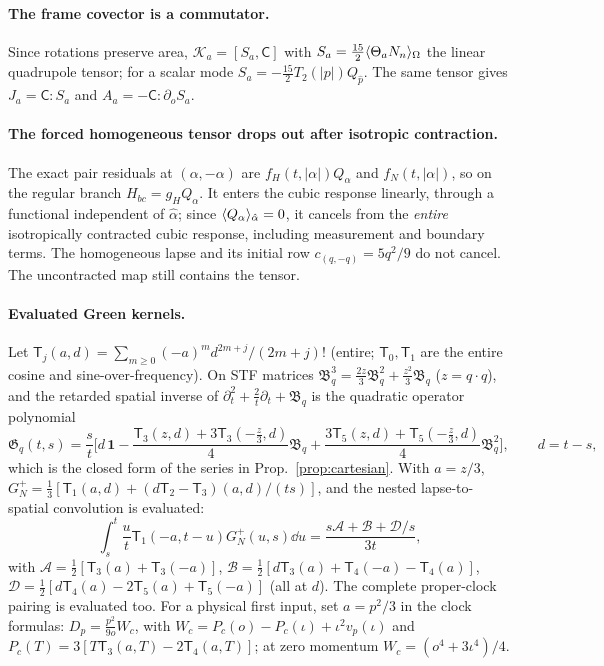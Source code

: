 \paragraph{The frame covector is a commutator.} Since rotations preserve area,
$\mathcal K_a=[S_a,\mathsf C]$ with $S_a=\frac{15}2\langle \Theta_aN_n\rangle_{\Omega}$ the linear quadrupole tensor;
for a scalar mode $S_a=-\frac{15}2T_2(|p|)Q_{\hat p}$. The same tensor gives $J_a=\mathsf C:S_a$ and
$A_a=-\mathsf C:\partial_oS_a$.

\paragraph{The forced homogeneous tensor drops out after isotropic contraction.} The exact pair
residuals at $(\alpha,-\alpha)$ are $f_H(t,|\alpha|)Q_\alpha$ and $f_N(t,|\alpha|)$, so on the regular
branch $H_{bc}=g_HQ_\alpha$. It enters the cubic response linearly, through a functional independent
of $\hat\alpha$; since $\langle Q_\alpha\rangle_{\hat\alpha}=0$, it cancels from the \emph{entire} isotropically
contracted cubic response, including measurement and boundary terms. The homogeneous lapse and
its initial row $c_{(q,-q)}=5q^2/9$ do not cancel. The uncontracted map still contains the tensor.

\paragraph{Evaluated Green kernels.} Let $\mathsf T_j(a,d)=\sum_{m\ge0}(-a)^md^{2m+j}/(2m+j)!$ (entire;
$\mathsf T_0,\mathsf T_1$ are the entire cosine and sine-over-frequency). On STF matrices
$\mathfrak B_q^3=\frac{2z}3\mathfrak B_q^2+\frac{z^2}3\mathfrak B_q$ ($z=q\cdot q$), and the retarded
spatial inverse of $\partial_t^2+\frac2t\partial_t+\mathfrak B_q$ is the quadratic operator polynomial
\begin{equation}\label{eq:spatial-green-poly}
 \mathfrak G_q(t,s)=\frac st\Big[d\,\mathbf 1-\frac{\mathsf T_3(z,d)+3\mathsf T_3(-\frac z3,d)}4\mathfrak B_q
 +\frac{3\mathsf T_5(z,d)+\mathsf T_5(-\frac z3,d)}4\mathfrak B_q^2\Big],\qquad d=t-s,
\end{equation}
which is the closed form of the series in Prop.~\ref{prop:cartesian}. With $a=z/3$,
$G_N^+=\frac13[\mathsf T_1(a,d)+(d\mathsf T_2-\mathsf T_3)(a,d)/(ts)]$, and the nested
lapse-to-spatial convolution is evaluated:
\[
\int_s^t\frac ut\mathsf T_1(-a,t-u)G_N^+(u,s)\dd u=\frac{s\mathcal A+\mathcal B+\mathcal D/s}{3t},
\]
with $\mathcal A=\frac12[\mathsf T_3(a)+\mathsf T_3(-a)]$, $\mathcal B=\frac12[d\mathsf T_3(a)+\mathsf T_4(-a)-\mathsf T_4(a)]$,
$\mathcal D=\frac12[d\mathsf T_4(a)-2\mathsf T_5(a)+\mathsf T_5(-a)]$ (all at $d$). The complete proper-clock
pairing is evaluated too. For a physical first input, set $a=p^2/3$ in the clock formulas:
$D_p=\frac{p^2}{9o}W_c$, with
$W_c=P_c(o)-P_c(\iota)+\iota^2v_p(\iota)$ and
$P_c(T)=3[T\mathsf T_3(a,T)-2\mathsf T_4(a,T)]$; at zero momentum
$W_c=(o^4+3\iota^4)/4$.

